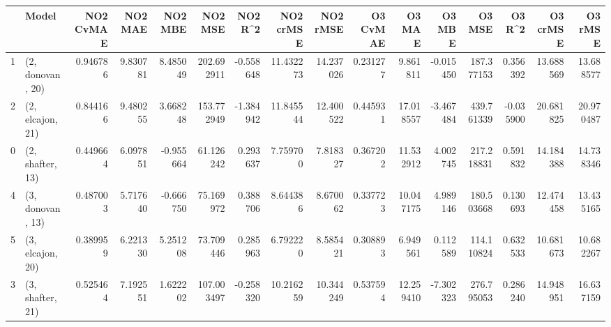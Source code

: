 \begin{tabular}{llrrrrrrrrrrrrrr}
\toprule
{} &             Model &  NO2 CvMAE &   NO2 MAE &   NO2 MBE &     NO2 MSE &   NO2 R\textasciicircum2 &  NO2 crMSE &   NO2 rMSE &  O3 CvMAE &     O3 MAE &    O3 MBE &      O3 MSE &    O3 R\textasciicircum2 &   O3 crMSE &    O3 rMSE \\
\midrule
1 &  (2, donovan, 20) &   0.946786 &  9.830781 &  8.485049 &  202.692911 & -0.558648 &  11.432273 &  14.237026 &  0.231277 &   9.861811 & -0.015450 &  187.377153 &  0.356392 &  13.688569 &  13.688577 \\
2 &  (2, elcajon, 21) &   0.844166 &  9.480255 &  3.668248 &  153.772949 & -1.384942 &  11.845544 &  12.400522 &  0.445931 &  17.018557 & -3.467484 &  439.761339 & -0.035900 &  20.681825 &  20.970487 \\
0 &  (2, shafter, 13) &   0.449664 &  6.097851 & -0.955664 &   61.126242 &  0.293637 &   7.759700 &   7.818327 &  0.367202 &  11.532912 &  4.002745 &  217.218831 &  0.591832 &  14.184388 &  14.738346 \\
4 &  (3, donovan, 13) &   0.487003 &  5.717640 & -0.666750 &   75.169972 &  0.388706 &   8.644386 &   8.670062 &  0.337723 &  10.047175 &  4.989146 &  180.503668 &  0.130693 &  12.474458 &  13.435165 \\
5 &  (3, elcajon, 20) &   0.389959 &  6.221330 &  5.251208 &   73.709446 &  0.285963 &   6.792220 &   8.585421 &  0.308893 &   6.949561 &  0.112589 &  114.110824 &  0.632533 &  10.681673 &  10.682267 \\
3 &  (3, shafter, 21) &   0.525464 &  7.192551 &  1.622202 &  107.003497 & -0.258320 &  10.216259 &  10.344249 &  0.537594 &  12.259410 & -7.302323 &  276.795053 &  0.286240 &  14.948951 &  16.637159 \\
\bottomrule
\end{tabular}
